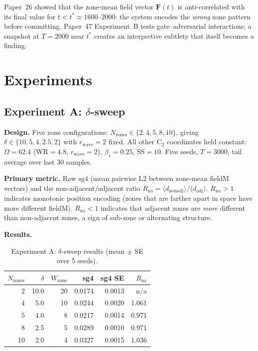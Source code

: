 \documentclass[11pt,a4paper]{article}
\begin{document}
Paper~26 showed that the zone-mean field vector $\mathbf{F}(t)$ is
anti-correlated with its final value for $t < t^* \approx 1600$--$2000$: the
system encodes the \emph{wrong} zone pattern before committing.
Paper~47 Experiment~B tests gate--adversarial interactions; a snapshot at
$T = 2000$ near $t^*$ creates an interpretive subtlety that itself becomes a
finding.

\section{Experiments}

\subsection{Experiment A: $\delta$-sweep}

\textbf{Design.}  Five zone configurations:
$N_\text{zones} \in \{2,4,5,8,10\}$,
giving $\delta \in \{10, 5, 4, 2.5, 2\}$ with $r_\text{wave}=2$ fixed.
All other C$_2$ coordinates held constant: $\Omega = 62.4$ (WR$=4.8$,
$r_\text{wave}=2$), $\beta_s = 0.25$, $\mathrm{SS}=10$.  Five seeds,
$T = 3000$, tail average over last 30 samples.

\textbf{Primary metric.} Raw $\mathrm{sg4}$ (mean pairwise L2 between zone-mean
fieldM vectors) and the non-adjacent/adjacent ratio
$R_\text{na} = \langle d_\text{nonadj}\rangle / \langle d_\text{adj}\rangle$.
$R_\text{na} > 1$ indicates monotonic position encoding (zones that are farther
apart in space have more different fieldM).  $R_\text{na} < 1$ indicates that
adjacent zones are \emph{more} different than non-adjacent zones, a sign of
sub-zone or alternating structure.

\textbf{Results.}

\begin{table}[h]
\centering
\caption{Experiment A: $\delta$-sweep results (mean $\pm$ SE over 5 seeds).}
\label{tab:expa}
\begin{tabular}{rrrrrr}
\toprule
$N_\text{zones}$ & $\delta$ & $W_\text{zone}$ & sg4 & sg4 SE & $R_\text{na}$ \\
\midrule
 2 & 10.0 & 20 & 0.0174 & 0.0013 & n/a \\
 4 &  5.0 & 10 & 0.0244 & 0.0020 & 1.061 \\
 5 &  4.0 &  8 & 0.0217 & 0.0014 & 0.971 \\
 8 &  2.5 &  5 & 0.0289 & 0.0010 & 0.971 \\
10 &  2.0 &  4 & 0.0327 & 0.0015 & 1.036 \\
\bottomrule
\end{tabular}
\end{table}
\end{document}
